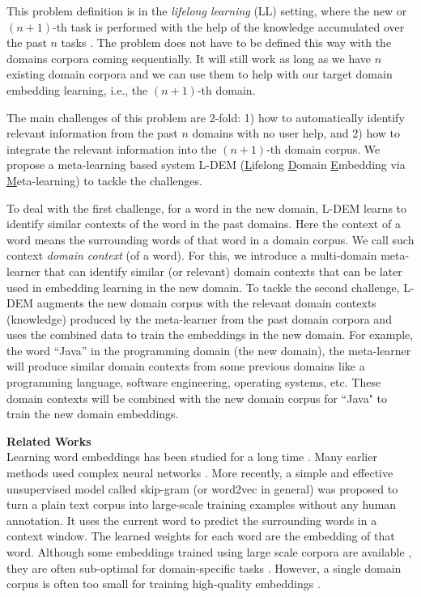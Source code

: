 This problem definition is in the
\textit{lifelong learning} (LL) setting, where the new or $(n+1)$-th task is performed with the help of the knowledge accumulated over the past $n$ tasks \cite{ChenLiu2016}. 
The problem does not have to be defined this way with the domains corpora coming sequentially. It will still work as long as we have $n$ existing domain corpora and we can use them to help with our target domain embedding learning, i.e., the $(n+1)$-th domain.

The main challenges of this problem are 2-fold:
1) how to automatically identify relevant information from the past $n$ domains with no user help, and 2) how to integrate the relevant information into the $(n+1)$-th domain corpus. We propose a meta-learning based system L-DEM (\underline{L}ifelong \underline{D}omain \underline{E}mbedding via \underline{M}eta-learning) to tackle the challenges.

To deal with the first challenge, for a word in the new domain, L-DEM learns to identify similar contexts of the word in the past domains. Here the context of a word means the surrounding words of that word in a domain corpus. We call such context \emph{domain context} (of a word). For this, we introduce a multi-domain meta-learner that can identify similar (or relevant) domain contexts that can be later used in embedding learning in the new domain. To tackle the second challenge, L-DEM augments the new domain corpus with the relevant domain contexts (knowledge) produced by the meta-learner from the past domain corpora and uses the combined data to train the embeddings in the new domain. For example, the word ``Java'' in the programming domain (the new domain), the meta-learner will produce similar domain contexts from some previous domains like a programming language, software engineering, operating systems, etc. These domain contexts will be combined with the new domain corpus for ``Java" to train the new domain embeddings.

\textbf{Related Works}\\
\label{chap3:rw}
Learning word embeddings has been studied for a long time \cite{mnih2007three}. 
Many earlier methods used complex neural networks \cite{mikolov2013linguistic}.
More recently, a simple and effective unsupervised model called skip-gram (or word2vec in general) \cite{mikolov2013distributed,mikolov2013linguistic} was proposed to turn a plain text corpus into large-scale training examples without any human annotation.
It uses the current word to predict the surrounding words in a context window.
The learned weights for each word are the embedding of that word.
Although some embeddings trained using large scale corpora are available \cite{pennington2014glove,bojanowski2016enriching}, they are often sub-optimal for domain-specific tasks \cite{bollegala-maehara-kawarabayashi:2015:ACL-IJCNLP,yang-lu-zheng:2017:EMNLP2017,xu:Short,Xu2018pro}. 
However, a single domain corpus is often too small for training high-quality embeddings \cite{Xu2018pro}.

